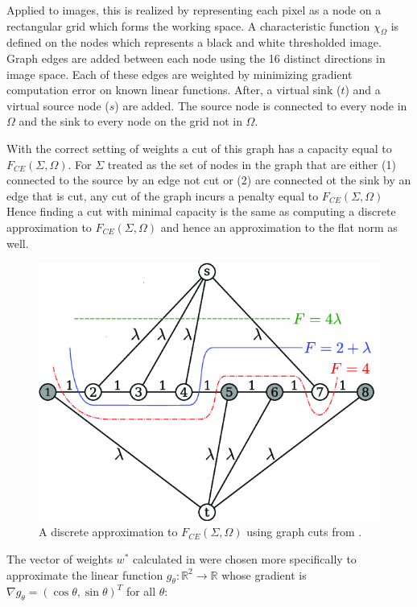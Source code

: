 \documentclass[12pt]{article}
\begin{document}
Applied to images, this is realized by representing each pixel as a node on a rectangular grid which forms the working space. A characteristic function $\chi_\Omega$ is defined on the nodes which represents a black and white thresholded image. Graph edges are added between each node using the 16 distinct directions in image space. Each of these edges are weighted by minimizing gradient computation error on known linear functions. After, a virtual sink ($t$) and a virtual source node ($s$) are added. The source node is connected to every node in $\Omega$ and the sink to every node on the grid not in $\Omega$. 

With the correct setting of weights a cut of this graph has a capacity equal to $F_{CE}(\Sigma,\Omega)$. For $\Sigma$ treated as the set of nodes in the graph that are either (1) connected to the source by an edge not cut or (2) are connected ot the sink by an edge that is cut, any cut of the graph incurs a penalty equal to $F_{CE}(\Sigma,\Omega)$ Hence finding a cut with minimal capacity is the same as computing a discrete approximation to $F_{CE}(\Sigma,\Omega)$ and hence an approximation to the flat norm as well. 

\begin{figure}[H]
	\centering
	\includegraphics[scale=1]{graph-cut-for-a-1-dimensional-image.png}
	\caption{A discrete approximation to $F_{CE}(\Sigma,\Omega)$ using graph cuts from \cite{Morgan_2007}.}
\end{figure}

The vector of weights $w^*$ calculated in \cite{shapes} were chosen more specifically to approximate the linear function $g_\theta:\mathbb{R}^2 \to \mathbb{R}$ whose gradient is $\nabla g_\theta = (\cos \theta, \sin \theta)^T$ for all $\theta$:
\end{document}
